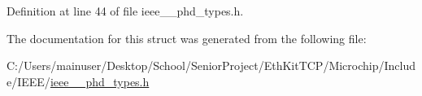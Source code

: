 Definition at line 44 of file ieee\+\_\+\_\+phd\+\_\+types.\+h.



The documentation for this struct was generated from the following file\+:\begin{DoxyCompactItemize}
\item 
C\+:/\+Users/mainuser/\+Desktop/\+School/\+Senior\+Project/\+Eth\+Kit\+T\+C\+P/\+Microchip/\+Include/\+I\+E\+E\+E/\hyperlink{ieee__11073__phd__types_8h}{ieee\+\_\+\_\+phd\+\_\+types.\+h}\end{DoxyCompactItemize}

